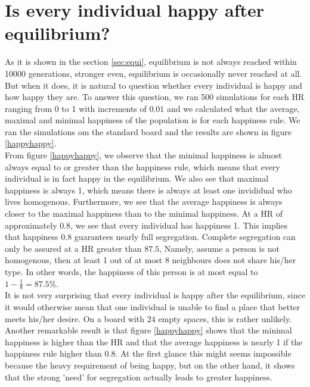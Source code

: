 
\section{Is every individual happy after equilibrium?}
As it is shown in the section \ref{sec:equi}, equilibrium is not always reached within 10000 generations, stronger even, equilibrium is occasionally never reached at all.
But when it does, it is natural to question whether every individual is happy and how happy they are. 
To answer this question, we ran 500 simulations for each HR ranging from 0 to 1 with increments of $0.01$ and we calculated what the average, maximal and minimal happiness of the population is for each happiness rule. 
We ran the simulations om the standard board and the results are shown in figure \ref{happyhappy}.\\

From figure \ref{happyhappy}, we observe that the minimal happiness is almost always equal to or greater than the happiness rule, which means that every individual is in fact happy  in the equilibrium. 
We also see that maximal happiness is always 1, which means there is always at least one invididual who lives homogenous. 
Furthermore, we see that the average happiness is always closer to the maximal happiness than to the minimal happiness. At a HR of approximately $0.8$, we see that every individual has happiness 1. 
This implies that happiness $0.8$ guarantees nearly full segregation. Complete segregation can only be assured at a HR greater than $87.5$, Namely, assume a person is not homogenous, then at least 1 out of at most 8 neighbours does not share his/her type. In other words, the happiness of this person is at most equal to \(1-\frac{1}{8}=87.5\%\).\\

It is not very surprising that every individual is happy after the equilibrium, since it would otherwise mean that one individual is unable to find a place that better meets his/her desire. 
On a board with $24$ empty spaces, this is rather unlikely. 
Another remarkable result is that figure \ref{happyhappy} shows that the minimal happiness is higher than the HR and that the average happiness is nearly 1 if the happiness rule higher than $0.8$. 
At the first glance this might seems impossible because the heavy requirement of being happy, but on the other hand, it shows that the strong 'need' for segregation actually leads to greater happiness.

